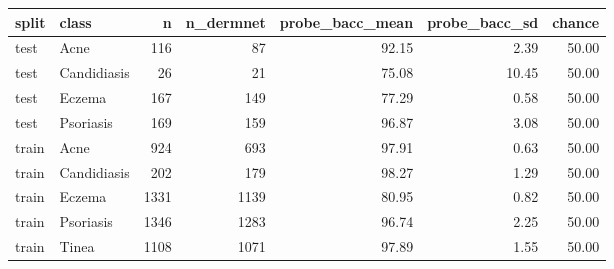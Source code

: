 \begin{tabular}{llrrrrr}
\toprule
split & class & n & n\_dermnet & probe\_bacc\_mean & probe\_bacc\_sd & chance \\
\midrule
test & Acne & 116 & 87 & 92.15 & 2.39 & 50.00 \\
test & Candidiasis & 26 & 21 & 75.08 & 10.45 & 50.00 \\
test & Eczema & 167 & 149 & 77.29 & 0.58 & 50.00 \\
test & Psoriasis & 169 & 159 & 96.87 & 3.08 & 50.00 \\
train & Acne & 924 & 693 & 97.91 & 0.63 & 50.00 \\
train & Candidiasis & 202 & 179 & 98.27 & 1.29 & 50.00 \\
train & Eczema & 1331 & 1139 & 80.95 & 0.82 & 50.00 \\
train & Psoriasis & 1346 & 1283 & 96.74 & 2.25 & 50.00 \\
train & Tinea & 1108 & 1071 & 97.89 & 1.55 & 50.00 \\
\bottomrule
\end{tabular}
